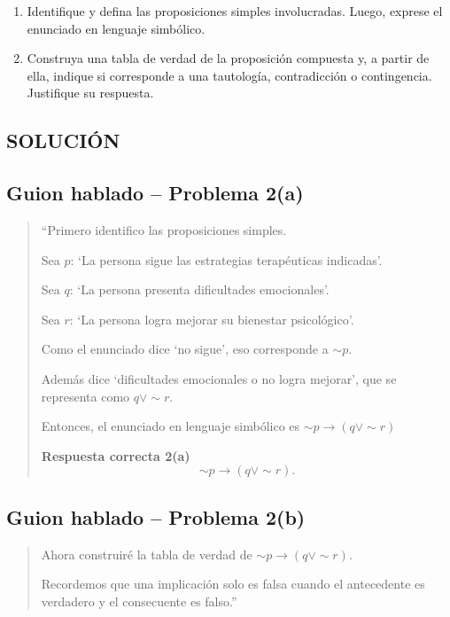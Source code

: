 \documentclass[12pt]{article}
\begin{document}
	\begin{enumerate}[label=\alph*)]
		\item Identifique y defina las proposiciones simples involucradas. Luego, exprese el enunciado en lenguaje simbólico.
		
		\item Construya una tabla de verdad de la proposición compuesta y, a partir de ella, indique si corresponde a una tautología, contradicción o contingencia. Justifique su respuesta.
	\end{enumerate}

	\subsection*{\textbf \Large SOLUCIÓN}
	\subsection*{Guion hablado -- Problema 2(a)}
	
	\begin{quote}
		“Primero identifico las proposiciones simples.
		
		Sea \(p\): ‘La persona sigue las estrategias terapéuticas indicadas’.
		
		Sea \(q\): ‘La persona presenta dificultades emocionales’.
		
		Sea \(r\): ‘La persona logra mejorar su bienestar psicológico’.
		
		Como el enunciado dice ‘no sigue’, eso corresponde a \(\sim p\).
		
		Además dice ‘dificultades emocionales o no logra mejorar’, que se representa como \(q\lor \sim r\).
		
			Entonces, el enunciado en lenguaje simbólico es $\sim p \to (q\lor \sim r)$
		
			\textbf{Respuesta correcta 2(a)}
		\[
		\sim p \to (q\lor \sim r).
		\]
	\end{quote}
	
	\subsection*{Guion hablado -- Problema 2(b)}
	
	\begin{quote}
		Ahora construiré la tabla de verdad de  $\sim p \to (q\lor \sim r)$.
		
		Recordemos que una implicación solo es falsa cuando el antecedente es verdadero y el consecuente es falso.”
	\end{quote}
	
\end{document}
